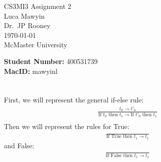 \documentclass[letterpaper]{article}
\theoremstyle{plain}
\theoremstyle{definition}
\theoremstyle{remark}
\begin{document}

\begin{titlepage}
    \centering
    \vspace*{3cm}
    
    {\Huge CS3MI3 Assignment 2}\\[2cm]
    
    {\large Luca Mawyin}\\[0.5cm]
    
    {\large Dr.\ JP Rooney}\\[0.5cm]

    {\large \today}\\[2cm]

    {\Large McMaster University}

    \vfill
    \begin{flushleft}

        {\large \textbf{Student Number: }400531739}\\[0.5cm]
        {\large \textbf{MacID:} mawyinl}
    \end{flushleft}

\end{titlepage}

\renewcommand{\thesection}{Question \arabic{section}}

\section{}

First, we will represent the general if-else rule:
\begin{align*}
    \frac{t_0\to t'_0}{\text{If }t_0\text{ then }t_1\to\text{If }t'_0\text{ then }t_1}\\
\end{align*}
Then we will represent the rules for True:
\begin{align*}
    \frac{}{\text{If True then }t_1\to t_1}
\end{align*}
and False:
\begin{align*}
    \frac{}{\text{If False then }t_1\to t_1}
\end{align*}

\section{}
\end{document}
